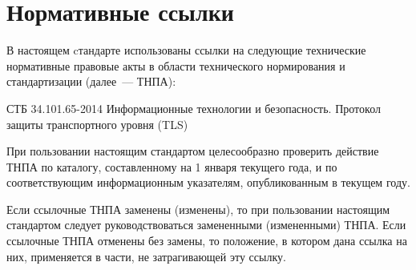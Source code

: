 \chapter{Нормативные ссылки}\label{REFS}

В настоящем cтандарте использованы ссылки на следующие 
технические нормативные правовые акты в области 
технического нормирования и стандартизации (далее~--- ТНПА):

СТБ 34.101.65-2014 Информационные технологии и безопасность. Протокол защиты 
транспортного уровня (TLS)




\begin{note*}
При пользовании настоящим стандартом целесообразно 
проверить действие ТНПА по каталогу,
составленному на 1 января текущего года, и по соответствующим 
информационным указателям, опубликованным в текущем году.

Если ссылочные ТНПА заменены (изменены), то при пользовании настоящим 
стандартом следует руководствоваться замененными (измененными) ТНПА. 
Если ссылочные ТНПА отменены без замены, то положение, в котором 
дана ссылка на них, применяется в части, не затрагивающей эту ссылку.
\end{note*}



